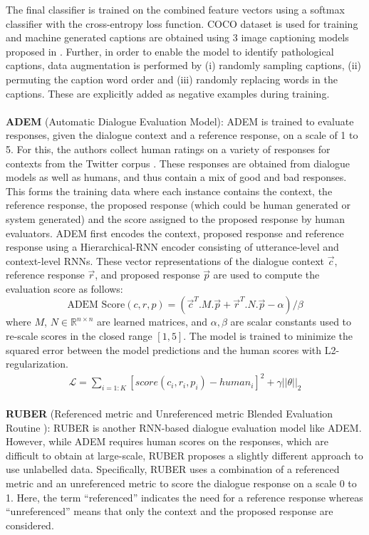 The final classifier is trained on the combined feature vectors using a softmax classifier with the cross-entropy loss function. COCO dataset  is used for training and machine generated captions are obtained using 3 image captioning models proposed in . Further, in order to enable the model to identify pathological captions, data augmentation is performed by (i) randomly sampling captions, (ii) permuting the caption word order and (iii) randomly replacing words in the captions. These are explicitly added as negative examples during training.\\
\\
\textbf{ADEM} (Automatic Dialogue Evaluation Model): ADEM  is trained to evaluate responses, given the dialogue context and a reference response, on a scale of 1 to 5. For this, the authors collect human ratings on a variety of responses for contexts from the Twitter corpus . These responses are obtained from dialogue models  as well as humans, and thus contain a mix of good and bad responses. This forms the training data where each instance contains the context, the reference response, the proposed response (which could be human generated or system generated) and the score assigned to the proposed response by human evaluators.
ADEM first encodes the context, proposed response and reference response using a Hierarchical-RNN  encoder consisting of utterance-level and context-level RNNs. These vector representations of the dialogue context $\overrightarrow{c}$, reference response $\overrightarrow{r}$, and proposed response $\overrightarrow{p}$ are used to compute the evaluation score as follows:
\begin{equation*}
    \mbox{ADEM\ Score}(c,r,p) = (\overrightarrow{c}^T .M. \overrightarrow{p} + \overrightarrow{r}^T. N. \overrightarrow{p} - \alpha)/ \beta
\end{equation*}
where $M$, $N \in \mathbb{R}^{n \times n}$ are learned matrices, and $\alpha, \beta$ are scalar constants used to re-scale scores in the closed range $[1, 5]$. 
The model is trained to minimize the squared error between the model predictions and the human scores with L2-regularization.
\begin{align*}
	\mathcal{L}=\sum_{i=1:K}[score(c_i,r_i,p_i)-human_i]^2+\gamma||\theta||_2
\end{align*}
\\
\textbf{RUBER} (Referenced metric and Unreferenced metric Blended Evaluation Routine ): RUBER is another RNN-based dialogue evaluation model like ADEM. However, while ADEM requires human scores on the responses, which are difficult to obtain at large-scale, RUBER proposes a slightly different approach to use unlabelled data. Specifically, RUBER uses a combination of a referenced metric and an unreferenced metric to score the dialogue response on a scale 0 to 1. Here, the term ``referenced'' indicates the need for a reference response whereas ``unreferenced'' means that only the context and the proposed response are considered.
